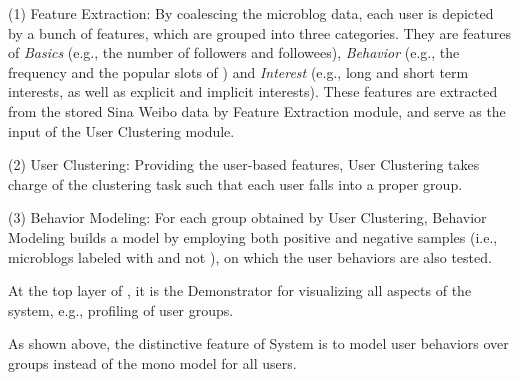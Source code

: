 	\stab(1)  Feature Extraction: By coalescing the microblog data, each user is depicted by a bunch of features, which are grouped into three categories. They are features of \textit{Basics} (e.g., the number of followers and followees), \textit{Behavior} (e.g., the frequency and the popular slots of \retg{}) and \textit{Interest} (e.g., long and short term interests, as well as explicit and implicit interests). These features are extracted from the stored  Sina Weibo data by Feature Extraction module, and serve as the input of the User Clustering module.
	
	\stab(2)  User Clustering: Providing the user-based features, User Clustering takes charge of the clustering task such that each user falls into a proper group.
	
	\stab(3)  Behavior Modeling: For each group obtained by User Clustering, Behavior Modeling builds a  model by employing both positive and negative samples (i.e., microblogs labeled with \retd{} and not \retd{}), on which the user \retg{} behaviors are also tested.
	
 At the top layer of \sys{}, it is the Demonstrator for visualizing all aspects of the system, e.g., profiling of user groups.


As shown above, the distinctive feature of System  \sys{} is to model user \retg{} behaviors over groups instead of the mono model for all users.

